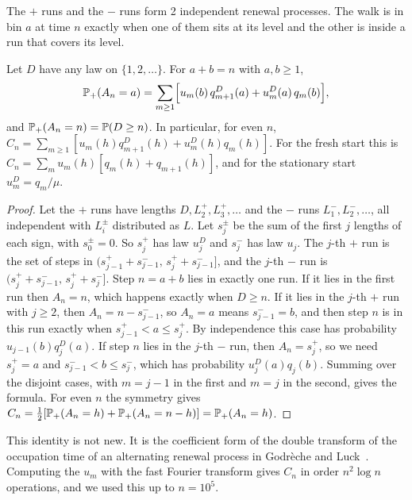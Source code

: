 The $+$ runs and the $-$ runs form 2 independent renewal processes. The
walk is in bin $a$ at time $n$ exactly when one of them sits at its level and
the other is inside a run that covers its level.

\begin{proposition}\label{prop:tworenewal}
Let $D$ have any law on $\{1,2,\dots\}$. For $a+b=n$ with $a,b\ge1$,
\[
 \mathbb{P}_+(A_n=a)=\sum_{m\ge1}\Bigl[u_m(b)\,q^D_{m+1}(a)+u^D_m(a)\,q_m(b)\Bigr],
\]
and $\mathbb{P}_+(A_n=n)=\mathbb{P}(D\ge n)$. In particular, for even $n$,
$C_n=\sum_{m\ge1}[u_m(h)q^D_{m+1}(h)+u^D_m(h)q_m(h)]$. For the fresh start
this is $C_n=\sum_mu_m(h)[q_m(h)+q_{m+1}(h)]$, and for the stationary start
$u^D_m=q_m/\mu$.
\end{proposition}

\begin{proof}
Let the $+$ runs have lengths $D,L^+_2,L^+_3,\dots$ and the $-$ runs
$L^-_1,L^-_2,\dots$, all independent with $L^\pm_i$ distributed as $L$. Let
$s^\pm_j$ be the sum of the first $j$ lengths of each sign, with $s^\pm_0=0$.
So $s^+_j$ has law $u^D_j$ and $s^-_j$ has law $u_j$. The $j$-th $+$ run is
the set of steps in $(s^+_{j-1}+s^-_{j-1},\,s^+_j+s^-_{j-1}]$, and the $j$-th
$-$ run is $(s^+_j+s^-_{j-1},\,s^+_j+s^-_j]$. Step $n=a+b$ lies in exactly one
run. If it lies in the first run then $A_n=n$, which happens exactly when
$D\ge n$. If it lies in the $j$-th $+$ run with $j\ge2$, then
$A_n=n-s^-_{j-1}$, so $A_n=a$ means $s^-_{j-1}=b$, and then step $n$ is in this
run exactly when $s^+_{j-1}<a\le s^+_j$. By independence this case has
probability $u_{j-1}(b)q^D_j(a)$. If step $n$ lies in the $j$-th $-$ run,
then $A_n=s^+_j$, so we need $s^+_j=a$ and $s^-_{j-1}<b\le s^-_j$, which has
probability $u^D_j(a)q_j(b)$. Summing over the disjoint cases, with $m=j-1$
in the first and $m=j$ in the second, gives the formula. For even $n$ the
symmetry gives $C_n=\frac12[\mathbb{P}_+(A_n=h)+\mathbb{P}_+(A_n=n-h)]=\mathbb{P}_+(A_n=h)$.
\end{proof}

This identity is not new. It is the coefficient form of the double transform
of the occupation time of an alternating renewal process in Godr\`eche and
Luck~\cite[Section~7]{godrecheluck2001}. Computing the $u_m$ with the fast
Fourier transform gives $C_n$ in order $n^2\log n$ operations, and we used
this up to $n=10^5$.

